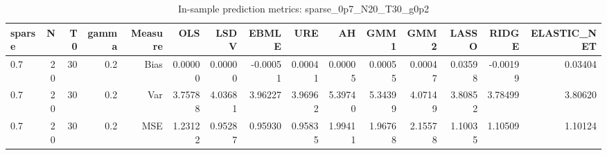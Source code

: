 \begin{table}[!htbp]\centering
\caption{In-sample prediction metrics: sparse_0p7_N20_T30_g0p2}
\label{tab:table2_sparse_0p7_N20_T30_g0p2}
\begin{tabular}{lrrrrrrrrrrrrrr}
\hline
sparse & N & T0 & gamma & Measure & OLS & LSDV & EBMLE & URE & AH & GMM1 & GMM2 & LASSO & RIDGE & ELASTIC_NET \\
\hline
0.7 & 20 & 30 & 0.2 & Bias & 0.00000 & 0.00000 & -0.00051 & 0.00041 & 0.00005 & 0.00055 & 0.00047 & 0.03598 & -0.00199 & 0.03404 \\
0.7 & 20 & 30 & 0.2 & Var & 3.75788 & 4.03681 & 3.96227 & 3.96962 & 5.39740 & 5.34399 & 4.07149 & 3.80852 & 3.78499 & 3.80620 \\
0.7 & 20 & 30 & 0.2 & MSE & 1.23122 & 0.95287 & 0.95930 & 0.95835 & 1.99411 & 1.96768 & 2.15578 & 1.10035 & 1.10509 & 1.10124 \\
\hline
\end{tabular}
\end{table}

